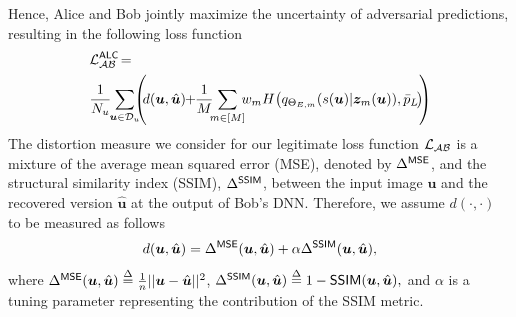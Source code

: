 \documentclass[conference]{IEEEtran}
\begin{document}
		Hence, {Alice and Bob jointly maximize the uncertainty of adversarial  predictions, resulting in 
		the following  loss function 
        \begin{align}
         & \hspace{0.5mm} \mathcal{L}^{\sf ALC}_{\cal AB} \hspace{-0.5mm}  = \nonumber \\
         & \hspace{0.5mm} \frac{1}{N_{u}}\hspace{-1mm}
		\sum_{{\bm u} \in \mathcal{D}_u} \hspace{-2mm}
		\left( \hspace{-1mm}
		d({\bm u}, {\hat{\bm u}}) \hspace{-1mm}
		+  \hspace{-1mm}
		\frac{1}{M} \hspace{-1.5mm} \sum_{m \in [M]} \hspace{-1.5mm} w_m
		H\hspace{-0.5mm}\left(q_{\Theta_{E,m}}({s{(\bm u)}|{\bm z}_m{(\bm u)}}),\bar{p}_L \hspace{-0.5mm}\right)\hspace{-1.0mm}
		\right) \label{eq:L_AB-LE}
        \end{align}
    	The distortion measure we consider for our legitimate loss function $	\mathcal{L}_{\cal AB}$ is a mixture of the average mean squared error (MSE), denoted by ${\Delta}^{\sf{MSE}}$, and 
    the structural similarity index (SSIM), ${\Delta}^{\sf{SSIM}}$,  between the  input image $\bm u$  and the recovered version $\hat{\bm u}$  at the output of Bob's DNN.
    Therefore, we assume $d(\cdot,\cdot)$ to be measured  as follows 
    \begin{align}\label{eq:distortion}
    	d(\bm u , \hat{\bm u}) = 
    	{\Delta}^{\sf{MSE}}(\bm u , \hat{\bm u}) + 
    	\alpha {\Delta}^{\sf{SSIM}}(\bm u , \hat{\bm u}),
    \end{align}
    where 
    $	\Delta^{\sf MSE} (\bm u , \hat{\bm u})
    \overset{\Delta}{=}\frac{1}{n}||\bm u-\hat{\bm u} ||^2$,  
    $\Delta^{\sf SSIM}(\bm u , \hat{\bm u}) \overset{\Delta}{=} 1- 	\mathsf{SSIM}(\bm u, \hat{\bm u}),  
    $  
    and $\alpha$ is a tuning parameter representing the contribution of the SSIM metric.  
}
\end{document}
